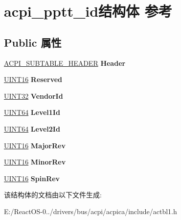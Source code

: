 \hypertarget{structacpi__pptt__id}{}\section{acpi\+\_\+pptt\+\_\+id结构体 参考}
\label{structacpi__pptt__id}
\subsection*{Public 属性}
\begin{DoxyCompactItemize}
\item 
\mbox{\label{structacpi__pptt__id_aa2abc3b054a6b002b5adad9d70f1d037}} 
\hyperlink{structacpi__subtable__header}{A\+C\+P\+I\+\_\+\+S\+U\+B\+T\+A\+B\+L\+E\+\_\+\+H\+E\+A\+D\+ER} {\bfseries Header}
\item 
\mbox{\label{structacpi__pptt__id_a474948758b03509ff1d02c6a36eb6e04}} 
\hyperlink{_processor_bind_8h_a09f1a1fb2293e33483cc8d44aefb1eb1}{U\+I\+N\+T16} {\bfseries Reserved}
\item 
\mbox{\label{structacpi__pptt__id_a72ed7e942a63b49fb3ee311ec9033f49}} 
\hyperlink{_processor_bind_8h_ae1e6edbbc26d6fbc71a90190d0266018}{U\+I\+N\+T32} {\bfseries Vendor\+Id}
\item 
\mbox{\label{structacpi__pptt__id_a24790ce6a54a27e80a0495df0f3491df}} 
\hyperlink{_processor_bind_8h_a57be03562867144161c1bfee95ca8f7c}{U\+I\+N\+T64} {\bfseries Level1\+Id}
\item 
\mbox{\label{structacpi__pptt__id_af3ba6131d41c5be3e0fa735e19802b7f}} 
\hyperlink{_processor_bind_8h_a57be03562867144161c1bfee95ca8f7c}{U\+I\+N\+T64} {\bfseries Level2\+Id}
\item 
\mbox{\label{structacpi__pptt__id_a96bb96fdb200f2374bb5d159422fcd66}} 
\hyperlink{_processor_bind_8h_a09f1a1fb2293e33483cc8d44aefb1eb1}{U\+I\+N\+T16} {\bfseries Major\+Rev}
\item 
\mbox{\label{structacpi__pptt__id_a8cd6ece254afd6e14ab67a26bec1e2e8}} 
\hyperlink{_processor_bind_8h_a09f1a1fb2293e33483cc8d44aefb1eb1}{U\+I\+N\+T16} {\bfseries Minor\+Rev}
\item 
\mbox{\label{structacpi__pptt__id_ad3f58e31f8ad6ad2af0c7be7b9f5f4ed}} 
\hyperlink{_processor_bind_8h_a09f1a1fb2293e33483cc8d44aefb1eb1}{U\+I\+N\+T16} {\bfseries Spin\+Rev}
\end{DoxyCompactItemize}


该结构体的文档由以下文件生成\+:\begin{DoxyCompactItemize}
\item 
E\+:/\+React\+O\+S-\/0../drivers/bus/acpi/acpica/include/actbl1.\+h\end{DoxyCompactItemize}
